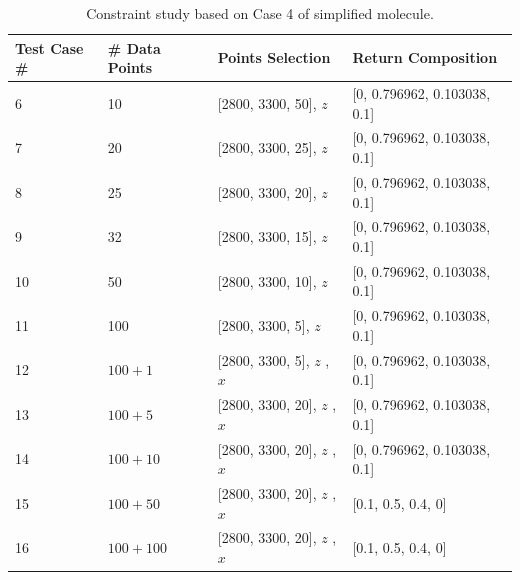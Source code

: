 \begin{table} \small
\begin{center}
{\def\arraystretch{1.5}
\begin{tabular}{| p{1cm} | p{3cm} | p{5cm} | l |} \hline
	Test Case \# & \# Data Points & Points Selection & Return Composition \\ \hline
	6 & 10 & [2800, 3300, 50], $z$ & [0, 0.796962, 0.103038, 0.1] \\ \hline
	7 & 20 & [2800, 3300, 25], $z$ & [0, 0.796962, 0.103038, 0.1] \\ \hline
	8 & 25 & [2800, 3300, 20], $z$ & [0, 0.796962, 0.103038, 0.1] \\ \hline
	9 & 32 & [2800, 3300, 15], $z$ & [0, 0.796962, 0.103038, 0.1] \\ \hline
	10 & 50 & [2800, 3300, 10], $z$ & [0, 0.796962, 0.103038, 0.1] \\ \hline
	11 & 100 & [2800, 3300, 5], $z$ & [0, 0.796962, 0.103038, 0.1] \\ \hline
	12 & $100 + 1$ & [2800, 3300, 5], $z$ \newline [2800, 3300, 500], $x$ & [0, 0.796962, 0.103038, 0.1] \\ \hline
	13 & $100 + 5$ & [2800, 3300, 20], $z$ \newline [2800, 3300, 100], $x$ & [0, 0.796962, 0.103038, 0.1] \\ \hline
	14 & $100 + 10$ & [2800, 3300, 20], $z$ \newline  [2800, 3300, 50], $x$ & [0, 0.796962, 0.103038, 0.1] \\ \hline
	15 & $100 + 50$ & [2800, 3300, 20], $z$ \newline  [2800, 3300, 10], $x$ & [0.1, 0.5, 0.4, 0] \\ \hline
	16 & $100 + 100$ & [2800, 3300, 20], $z$ \newline  [2800, 3300, 5], $x$ & [0.1, 0.5, 0.4, 0] \\ 
	\hline
\end{tabular} 
}
\end{center}
\caption{Constraint study based on Case 4 of simplified molecule.} \label{tab:7.3}
\end{table}

